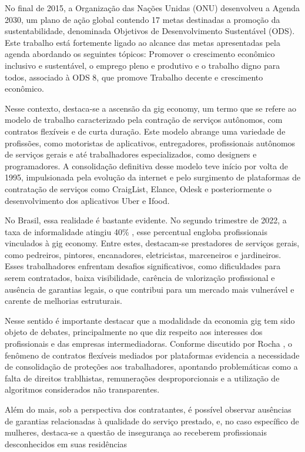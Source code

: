 No final de 2015, a Organização das Nações Unidas (ONU) desenvolveu a Agenda 2030, um plano de ação global contendo 17 metas destinadas a promoção da sustentabilidade, denominada Objetivos de Desenvolvimento Sustentável (ODS). Este trabalho está fortemente ligado ao alcance das metas apresentadas pela agenda abordando os seguintes tópicos: Promover o crescimento econômico inclusivo e sustentável, o emprego pleno e produtivo e o trabalho digno para todos, associado à ODS 8, que promove Trabalho decente e crescimento econômico. 

Nesse contexto, destaca-se a ascensão da gig economy, um termo que se refere ao modelo de trabalho caracterizado pela contração de serviços autônomos, com contratos flexíveis e de curta duração. Este modelo abrange uma variedade de profissões, como motoristas de aplicativos, entregadores, profissionais autônomos de serviços gerais e até trabalhadores especializados, como designers e programadores. A consolidação definitiva desse modelo teve início por volta de 1995, impulsionada pela evolução da internet e pelo surgimento de plataformas de contratação de serviços como CraigList, Elance, Odesk \cite{ROCKCONTENT2023} e posteriormente o desenvolvimento dos aplicativos Uber e Ifood.  

No Brasil, essa realidade é bastante evidente. No segundo trimestre de 2022, a taxa de informalidade atingiu 40\% \cite{IBGE2022}, esse percentual engloba profissionais vinculados à gig economy. Entre estes, destacam-se prestadores de serviços gerais, como pedreiros, pintores, encanadores, eletricistas, marceneiros e jardineiros. Esses trabalhadores enfrentam desafios significativos, como dificuldades para serem contratados, baixa visibilidade, carência de valorização profissional e ausência de garantias legais, o que contribui para um mercado mais vulnerável e carente de melhorias estruturais.  

Nesse sentido é importante destacar que a modalidade da economia gig tem sido objeto de debates, principalmente no que diz respeito aos interesses dos profissionais e das empresas intermediadoras. Conforme discutido por Rocha \cite{RochaFerreira2022}, o fenômeno de contratos flexíveis mediados por plataformas evidencia a necessidade de consolidação de proteções aos trabalhadores, apontando problemáticas como a falta de direitos trablhistas, remunerações desproporcionais e a utilização de algoritmos considerados não transparentes. 

Além do mais, sob a perspectiva dos contratantes, é possível observar ausências de garantias relacionadas à qualidade do serviço prestado, e, no caso específico de mulheres, destaca-se a questão de insegurança ao receberem profissionais desconhecidos em suas residências \cite{ESTADAO2020} 

